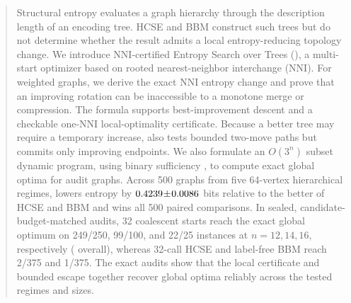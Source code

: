 \begin{abstract}
Structural entropy evaluates a graph hierarchy through the description length
of an encoding tree. HCSE and BBM \cite{pan2025} construct such trees but do not
determine whether the result admits a local entropy-reducing topology change.
We introduce NNI-certified Entropy Search over Trees (\NEST), a multi-start
optimizer based on rooted nearest-neighbor interchange (NNI). For weighted
graphs, we derive the exact NNI entropy change and prove that an improving
rotation can be inaccessible to a monotone merge or compression. The formula
supports best-improvement descent and a checkable one-NNI local-optimality
certificate. Because a better tree may require a temporary increase, \NEST also
tests bounded two-move paths but commits only improving endpoints. We also
formulate an $O(3^n)$ subset dynamic program, using binary sufficiency
\cite{zhang2021supertad,pan2025}, to compute exact global optima for audit
graphs. Across 500 graphs from five 64-vertex
hierarchical regimes, \NEST lowers entropy by
$\NESTGainVsBestExternal\!\pm\!\NESTGainVsBestExternalCI$ bits relative to the
better of HCSE and BBM and wins all 500 paired comparisons. In sealed,
candidate-budget-matched audits, 32 coalescent starts reach the exact global
optimum on 249/250, 99/100, and 22/25 instances at $n=12,14,16$, respectively
(\ScaleCombinedExact{} overall), whereas 32-call HCSE and label-free BBM reach
2/375 and 1/375. The exact audits show that the local certificate and bounded
escape together recover global optima reliably across the tested regimes and
sizes.
\end{abstract}
